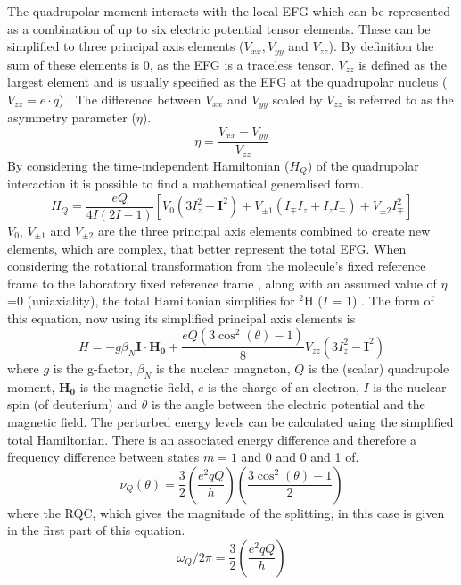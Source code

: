 The quadrupolar moment interacts with the local \ac{EFG} which can be represented as a combination of up to six electric potential tensor elements. These can be simplified to three principal axis elements ($V_{xx}, V_{yy}$ and $V_{zz}$). By definition the sum of these elements is 0, as the \ac{EFG} is a traceless tensor. $V_{zz}$ is defined as the largest element and is usually specified as the \ac{EFG} at the quadrupolar nucleus ($V_{zz} = e\cdot q$) \cite{Elliott2021WhatMedia}. The difference between $V_{xx}$ and $V_{yy}$ scaled by $V_{zz}$ is referred to as the asymmetry parameter ($\eta$).
\begin{equation}
    \eta = \frac{V_{xx}-V_{yy}}{V_{zz}}
\end{equation}
By considering the time-independent Hamiltonian ($H_Q$) of the quadrupolar interaction it is possible to find a mathematical generalised form.
\begin{equation}
    H_Q = \frac{eQ}{4I(2I-1)}[V_0(3I^2_z-\boldsymbol{I}^2) + V_{\pm1}(I_{\mp}I_z+I_zI_\mp)+V_{\pm2}I^2_\mp]
\end{equation}
$V_0$, $V_{\pm1}$ and $V_{\pm2}$ are the three principal axis elements combined to create new elements, which are complex, that better represent the total \ac{EFG}. When considering the rotational transformation from the molecule's fixed reference frame to the laboratory fixed reference frame \cite{Seelig1977DeuteriumMembranes}, along with an assumed value of $\eta$=0 (uniaxiality), the total Hamiltonian simplifies for $^2$H ($I$ = 1)  \cite{Sharf1995DetectionNMR-Spectroscopy}. The form of this equation, now using its simplified principal axis elements is
\begin{equation}
    H = -g\beta_N\boldsymbol{I}\cdot\boldsymbol{H_0} + \frac{eQ(3\cos^2(\theta)-1)}{8}V_{zz}(3I_z^2-\boldsymbol{I}^2)
\end{equation}
where $g$ is the g-factor, $\beta_N$ is the nuclear magneton, $Q$ is the (scalar) quadrupole moment, $\boldsymbol{H_0}$ is the magnetic field, $e$ is the charge of an electron, $I$ is the nuclear spin (of deuterium) and $\theta$ is the angle between the electric potential and the magnetic field. The perturbed energy levels can be calculated using the simplified total Hamiltonian. There is an associated energy difference and therefore a frequency difference between states $m=1$ and 0 and 0 and 1 of.
\begin{equation}
    \nu_Q(\theta) = \frac{3}{2}\left(\frac{e^2qQ}{h}\right)\left(\frac{3\cos^2(\theta)-1}{2}\right)
    \label{eqn:Quad:Angle}
\end{equation}
where the \ac{RQC}, which gives the magnitude of the splitting, in this case is given in the first part of this equation.
\begin{equation}
    \omega_Q/2\pi = \frac{3}{2}\left(\frac{e^2qQ}{h}\right)
    \label{eqn:Quad:RQC}
\end{equation}

